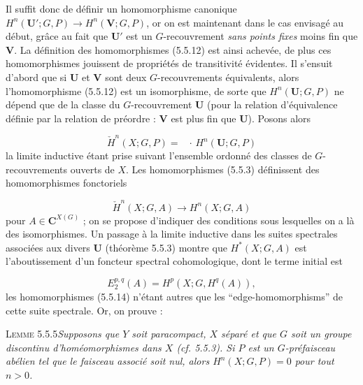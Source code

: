 \clearpage
{}

\noindent Il suffit donc de définir un homomorphisme canonique
$H^n({\mathbf U}';G,P)\to H^n({\mathbf V};G,P)$, or on est maintenant dans le
cas envisagé au début, grâce au fait que ${\mathbf U}'$ est un
$G$-recouvrement \emph{sans points fixes} moins fin que ${\mathbf V}$. La définition
des homomorphismes (5.5.12) est ainsi achevée, de plus ces homomorphismes
jouissent de propriétés de transitivité évidentes. Il s'ensuit d'abord que si
${\mathbf U}$ et ${\mathbf V}$ sont deux $G$-recouvrements équivalents, alors
l'homomorphisme (5.5.12) est un isomorphisme, de sorte que
$H^n({\mathbf U};G,P)$ ne dépend que de la classe du $G$-recouvrement
${\mathbf U}$ (pour la relation d'équivalence définie par la relation de
préordre : ${\mathbf V}$ est plus fin que ${\mathbf U}$). Posons alors

\[
\tag{5.5.13}
\check H^n(X;G,P)=\mathop{\underset{\to}{\lim}}\,\cdot\,H^n({\mathbf U};G,P)
\]
la limite inductive étant prise suivant l'ensemble ordonné des
classes de $G$-recouvrements ouverts de $X$. Les homomorphismes (5.5.3)
définissent des homomorphismes fonctoriels

\[
\tag{5.5.14}
\check H^n(X;G,A)\to H^n(X;G,A)
\]
pour $A\in {\mathbf C}^{X(G)}$ ; on se propose d'indiquer des conditions sous
lesquelles on a là des isomorphismes. Un passage à la limite inductive dans
les suites spectrales associées aux divers ${\mathbf U}$ (théorème 5.5.3)
montre que $H^*(X;G,A)$ est l'aboutissement d'un foncteur spectral
cohomologique, dont le terme initial est

\[
\tag{5.5.15}
E_2^{p,q}(A)=H^p(X;G,H^q(A)),
\]
les homomorphismes (5.5.14) n'étant autres que les
``edge-homomorphisms'' de cette suite spectrale. Or, on prouve :

\textsc{Lemme 5.5.5}\quad \textit{Supposons que $Y$ soit
paracompact, $X$ séparé et que $G$ soit un groupe discontinu
d'homéomorphismes dans $X$ \textup{(}\textit{cf.}\textup{ 5.5.3)}. Si $P$ est un $G$-préfaisceau abélien
tel que le faisceau associé soit nul, alors $H^n(X;G,P)=0$ pour tout
$n>0$.}

